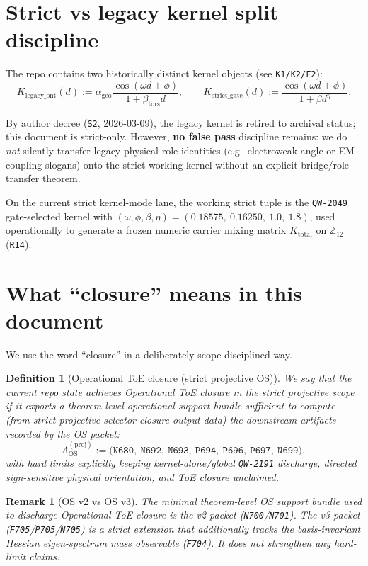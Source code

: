 \documentclass[11pt,a4paper]{article}
\newtheorem{definition}{Definition}[section]
\newtheorem{remark}{Remark}[section]
\begin{document}
\section{Strict vs legacy kernel split discipline}

The repo contains two historically distinct kernel objects (see \texttt{K1/K2/F2}):
\[
K_{\mathrm{legacy\_ont}}(d)
:=
\alpha_{\mathrm{geo}}\frac{\cos(\omega d+\phi)}{1+\beta_{\mathrm{tors}}d},
\qquad
K_{\mathrm{strict\_gate}}(d)
:=
\frac{\cos(\omega d+\phi)}{1+\beta d^{\eta}}.
\]

By author decree (\texttt{S2}, 2026-03-09), the legacy kernel is retired to archival status; this document is strict-only.
However, \textbf{no false pass} discipline remains:
we do \emph{not} silently transfer legacy physical-role identities (e.g.\ electroweak-angle or EM coupling slogans) onto the strict working kernel without an explicit bridge/role-transfer theorem.

On the current strict kernel-mode lane, the working strict tuple is the \texttt{QW-2049} gate-selected kernel with
$(\omega,\phi,\beta,\eta)=(0.18575,\ 0.16250,\ 1.0,\ 1.8)$, used operationally to generate a frozen numeric carrier mixing matrix $K_{\mathrm{total}}$ on $\mathbb{Z}_{12}$ (\texttt{R14}).
\section{What “closure” means in this document}

We use the word “closure” in a deliberately scope-disciplined way.

\begin{definition}[Operational ToE closure (strict projective OS)]
We say that the current repo state achieves \emph{Operational ToE closure} in the strict \emph{projective} scope if it exports a theorem-level
operational support bundle sufficient to compute (from strict projective selector closure output data) the downstream artifacts recorded by the OS packet:
\[
\Lambda_{\mathrm{OS}}^{(\mathrm{proj})} :=
\bigl(
\texttt{N680},\ \texttt{N692},\ \texttt{N693},\ \texttt{P694},\ \texttt{P696},\ \texttt{P697},\ \texttt{N699}
\bigr),
\]
with hard limits explicitly keeping \emph{kernel-alone/global} \texttt{QW-2191} discharge, directed sign-sensitive physical orientation, and ToE closure unclaimed.
\end{definition}

\begin{remark}[OS v2 vs OS v3]
The minimal theorem-level OS support bundle used to discharge \emph{Operational ToE closure} is the v2 packet (\texttt{N700}/\texttt{N701}).
The v3 packet (\texttt{F705}/\texttt{P705}/\texttt{N705}) is a strict extension that additionally tracks the basis-invariant Hessian eigen-spectrum mass observable (\texttt{F704}).
It does not strengthen any hard-limit claims.
\end{remark}
\end{document}
